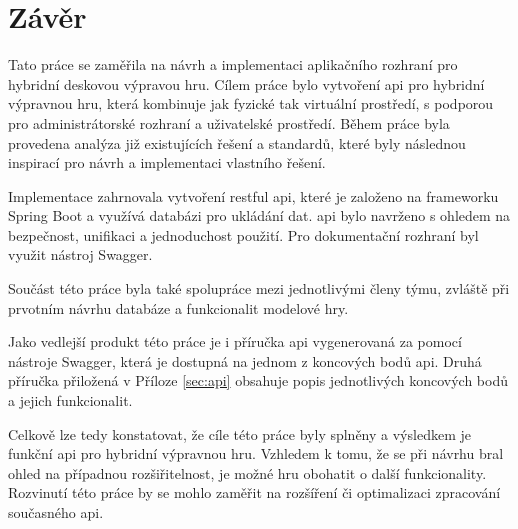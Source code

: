 \chapter{Závěr}
Tato práce se zaměřila na návrh a implementaci aplikačního rozhraní pro hybridní deskovou výpravou hru. Cílem práce bylo vytvoření \gls{api} pro hybridní výpravnou hru, která kombinuje jak fyzické tak virtuální prostředí, s podporou pro administrátorské rozhraní a uživatelské prostředí. Během práce byla provedena analýza již existujících řešení a standardů, které byly následnou inspirací pro návrh a implementaci vlastního řešení.

Implementace zahrnovala vytvoření \gls{restful api}, které je založeno na \gls{framework}u Spring Boot a využívá databázi pro ukládání dat. \gls{api} bylo navrženo s ohledem na bezpečnost, unifikaci a jednoduchost použití. Pro dokumentační rozhraní byl využit nástroj Swagger.

Součást této práce byla také spolupráce mezi jednotlivými členy týmu, zvláště při prvotním návrhu databáze a funkcionalit modelové hry.

Jako vedlejší produkt této práce je i příručka \gls{api} vygenerovaná za pomocí nástroje Swagger, která je dostupná na jednom z koncových bodů \gls{api}. Druhá příručka přiložená v Příloze \ref{sec:api}
 obsahuje popis jednotlivých koncových bodů a jejich funkcionalit.

Celkově lze tedy konstatovat, že cíle této práce byly splněny a výsledkem je funkční \gls{api} pro hybridní výpravnou hru. Vzhledem k tomu, že se při návrhu bral ohled na případnou rozšiřitelnost, je možné hru obohatit o další funkcionality. Rozvinutí této práce by se mohlo zaměřit na rozšíření či optimalizaci zpracování současného \gls{api}.

\endinput